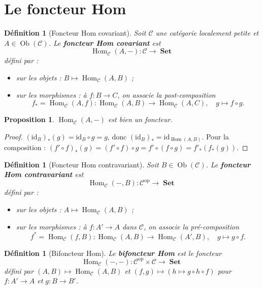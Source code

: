 \documentclass[a4paper,12pt]{book}
\DeclareMathOperator{\Hom}{Hom}
\DeclareMathOperator{\Ob}{Ob}
\DeclareMathOperator{\Set}{\mathbf{Set}}
\newcommand{\op}{\mathrm{op}}
\newcommand{\id}{\mathrm{id}}
\newtheorem{proposition}[theoreme]{Proposition}
\newtheorem{definition}[theoreme]{Définition}
\begin{document}
\section{Le foncteur Hom}

\begin{definition}[Foncteur Hom covariant]\label{def:hom-covariant}
\index{Hom@$\Hom$}
Soit $\mathcal{C}$ une catégorie localement petite et $A \in \Ob(\mathcal{C})$. Le \textbf{foncteur Hom covariant} est
\[
  \Hom_\mathcal{C}(A, -) : \mathcal{C} \longrightarrow \Set
\]
défini par :
\begin{itemize}
  \item sur les objets : $B \mapsto \Hom_\mathcal{C}(A, B)$ ;
  \item sur les morphismes : à $f : B \to C$, on associe la post-composition
  \[
    f_* = \Hom_\mathcal{C}(A, f) : \Hom_\mathcal{C}(A, B) \to \Hom_\mathcal{C}(A, C), \quad g \mapsto f \circ g.
  \]
\end{itemize}
\end{definition}

\begin{proposition}\label{prop:hom-cov-foncteur}
$\Hom_\mathcal{C}(A, -)$ est bien un foncteur.
\end{proposition}

\begin{proof}
$(\id_B)_*(g) = \id_B \circ g = g$, donc $(\id_B)_* = \id_{\Hom(A,B)}$. Pour la composition : $(f' \circ f)_*(g) = (f' \circ f) \circ g = f' \circ (f \circ g) = f'_*(f_*(g))$.
\end{proof}

\begin{definition}[Foncteur Hom contravariant]\label{def:hom-contravariant}
Soit $B \in \Ob(\mathcal{C})$. Le \textbf{foncteur Hom contravariant} est
\[
  \Hom_\mathcal{C}(-, B) : \mathcal{C}^{\op} \longrightarrow \Set
\]
défini par :
\begin{itemize}
  \item sur les objets : $A \mapsto \Hom_\mathcal{C}(A, B)$ ;
  \item sur les morphismes : à $f : A' \to A$ dans $\mathcal{C}$, on associe la pré-composition
  \[
    f^* = \Hom_\mathcal{C}(f, B) : \Hom_\mathcal{C}(A, B) \to \Hom_\mathcal{C}(A', B), \quad g \mapsto g \circ f.
  \]
\end{itemize}
\end{definition}

\begin{definition}[Bifoncteur Hom]\label{def:hom-bifoncteur}
Le \textbf{bifoncteur Hom} est le foncteur
\[
  \Hom_\mathcal{C}(-, -) : \mathcal{C}^{\op} \times \mathcal{C} \longrightarrow \Set
\]
défini par $(A, B) \mapsto \Hom_\mathcal{C}(A, B)$ et $(f, g) \mapsto (h \mapsto g \circ h \circ f)$ pour $f : A' \to A$ et $g : B \to B'$.
\end{definition}
\end{document}
